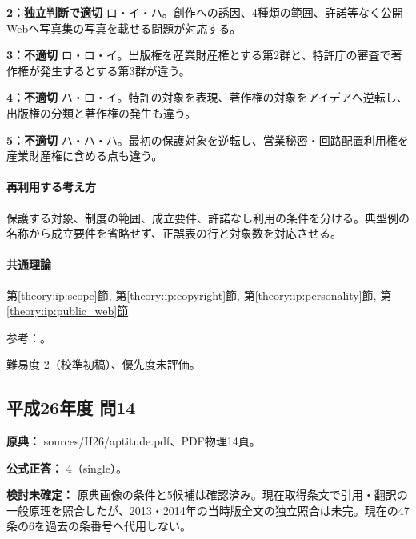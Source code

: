 \noindent\textbf{2：独立判断で適切} ロ・イ・ハ。創作への誘因、4種類の範囲、許諾等なく公開Webへ写真集の写真を載せる問題が対応する。\par

\noindent\textbf{3：不適切} ロ・ロ・イ。出版権を産業財産権とする第2群と、特許庁の審査で著作権が発生するとする第3群が違う。\par

\noindent\textbf{4：不適切} ハ・ロ・イ。特許の対象を表現、著作権の対象をアイデアへ逆転し、出版権の分類と著作権の発生も違う。\par

\noindent\textbf{5：不適切} ハ・ハ・ハ。最初の保護対象を逆転し、営業秘密・回路配置利用権を産業財産権に含める点も違う。\par

\paragraph{再利用する考え方} 保護する対象、制度の範囲、成立要件、許諾なし利用の条件を分ける。典型例の名称から成立要件を省略せず、正誤表の行と対象数を対応させる。

\paragraph{共通理論} \hyperref[theory:ip:scope]{第\ref*{theory:ip:scope}節}, \hyperref[theory:ip:copyright]{第\ref*{theory:ip:copyright}節}, \hyperref[theory:ip:personality]{第\ref*{theory:ip:personality}節}, \hyperref[theory:ip:public_web]{第\ref*{theory:ip:public_web}節}

\par 参考：\cite{ip_industrial_four,ip_copyright_statute}。

\par 難易度 2（校準初稿）、優先度未評価。

\subsection{平成26年度 問14}
\label{q:h26-reg-apt-14}

\noindent\textbf{原典：} sources/H26/aptitude.pdf、PDF物理14頁。

\textbf{公式正答：} 4（single）。

\par\textbf{検討未確定：} 原典画像の条件と5候補は確認済み。現在取得条文で引用・翻訳の一般原理を照合したが、2013・2014年の当時版全文の独立照合は未完。現在の47条の6を過去の条番号へ代用しない。

